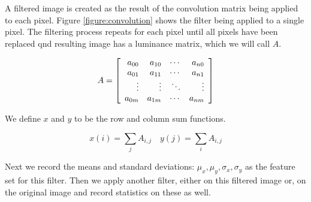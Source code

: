 A filtered image is created as the result of the convolution matrix being
applied to each pixel. Figure \ref{figure:convolution} shows the filter being
applied to a single pixel. The filtering process repeats for each pixel until
all pixels have been replaced qnd resulting image has a luminance matrix,
which we will call $A$.

\[A = \left [
    \begin{array}{r r r r}
        a_{00} & a_{10} & \cdots & a_{n0} \\
        a_{01} & a_{11} & \cdots & a_{n1}\\
        \vdots  & \vdots  & \ddots & \vdots\\
        a_{0m} & a_{1m} & \cdots & a_{nm}\\
    \end{array}
\right ] \]

We define $x$ and $y$ to be the row and column sum functions.

\begin{equation}
x(i) = \sum_{j}{A_{i,j}} \quad
y(j) = \sum_{i}{A_{i,j}}
\end{equation}

Next we record the means and standard deviations: $\mu_x, \mu_y, \sigma_x,
\sigma_y$ as the feature set for this filter. Then we apply another
filter, either on this filtered image or, on the original image and record
statistics on these as well.

